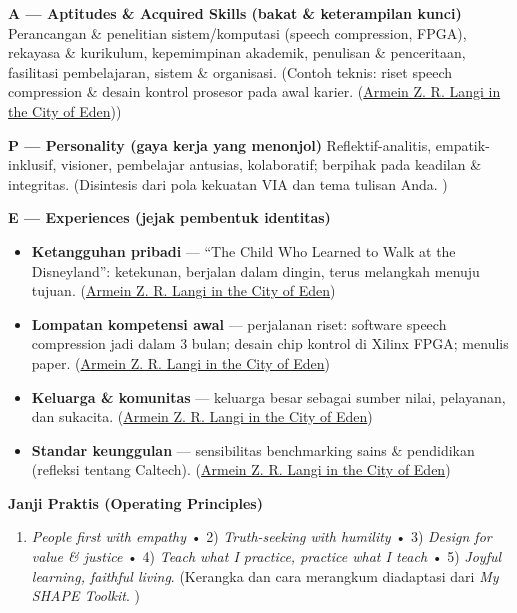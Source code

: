 \documentclass[
  letterpaper,
  DIV=11,
  numbers=noendperiod]{scrreprt}
\providecommand{\tightlist}{%
  \setlength{\itemsep}{0pt}\setlength{\parskip}{0pt}}\usepackage{longtable,booktabs,array}
\begin{document}
\textbf{A --- Aptitudes \& Acquired Skills (bakat \& keterampilan
kunci)} Perancangan \& penelitian sistem/komputasi (speech compression,
FPGA), rekayasa \& kurikulum, kepemimpinan akademik, penulisan \&
penceritaan, fasilitasi pembelajaran, sistem \& organisasi. (Contoh
teknis: riset speech compression \& desain kontrol prosesor pada awal
karier.
(\href{https://azrl.wordpress.com/2008/05/25/the-journey-4/?utm_source=chatgpt.com}{Armein
Z. R. Langi in the City of Eden}))

\textbf{P --- Personality (gaya kerja yang menonjol)}
Reflektif-analitis, empatik-inklusif, visioner, pembelajar antusias,
kolaboratif; berpihak pada keadilan \& integritas. (Disintesis dari pola
kekuatan VIA dan tema tulisan Anda. )

\textbf{E --- Experiences (jejak pembentuk identitas)}

\begin{itemize}
\tightlist
\item
  \textbf{Ketangguhan pribadi} --- ``The Child Who Learned to Walk at
  the Disneyland'': ketekunan, berjalan dalam dingin, terus melangkah
  menuju tujuan.
  (\href{https://azrl.wordpress.com/?utm_source=chatgpt.com}{Armein Z.
  R. Langi in the City of Eden})
\item
  \textbf{Lompatan kompetensi awal} --- perjalanan riset: software
  speech compression jadi dalam 3 bulan; desain chip kontrol di Xilinx
  FPGA; menulis paper.
  (\href{https://azrl.wordpress.com/2008/05/25/the-journey-4/?utm_source=chatgpt.com}{Armein
  Z. R. Langi in the City of Eden})
\item
  \textbf{Keluarga \& komunitas} --- keluarga besar sebagai sumber
  nilai, pelayanan, dan sukacita.
  (\href{https://azrl.wordpress.com/2008/12/01/family/?utm_source=chatgpt.com}{Armein
  Z. R. Langi in the City of Eden})
\item
  \textbf{Standar keunggulan} --- sensibilitas benchmarking sains \&
  pendidikan (refleksi tentang Caltech).
  (\href{https://azrl.wordpress.com/2008/07/29/caltech/?utm_source=chatgpt.com}{Armein
  Z. R. Langi in the City of Eden})
\end{itemize}

\textbf{Janji Praktis (Operating Principles)}

\begin{enumerate}
\def\labelenumi{\arabic{enumi}.}
\tightlist
\item
  \emph{People first with empathy} • 2) \emph{Truth-seeking with
  humility} • 3) \emph{Design for value \& justice} • 4) \emph{Teach
  what I practice, practice what I teach} • 5) \emph{Joyful learning,
  faithful living}. (Kerangka dan cara merangkum diadaptasi dari
  \emph{My SHAPE Toolkit}. )
\end{enumerate}
\end{document}
